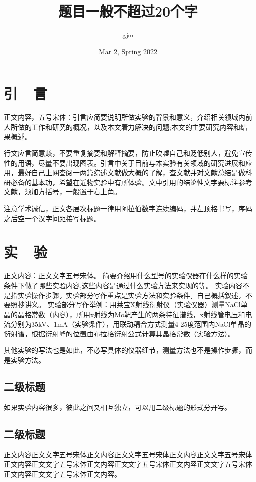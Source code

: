 \documentclass{gjm_report}
\date{Mar 2, Spring 2022}
\title{题目一般不超过20个字}
\author{gjm}
\begin{document}
\maketitle
\begin{multicols}{2}

\section{引~~言}
正文内容，五号宋体：引言应简要说明所做实验的背景和意义，介绍相关领域内前人所做的工作和研究的概况，以及本文着力解决的问题;本文的主要研究内容和结果概述。

行文应言简意赅，不要重复摘要和解释摘要，防止吹嘘自己和贬低别人，避免宣传性的用语，尽量不要出现图表。引言中关于目前与本实验有关领域的研究进展和应用，最好自己上网查阅一两篇综述文献做大概的了解，查文献并对文献总结是做科研必备的基本功，希望在近物实验中有所体验。文中引用的结论性文字要标注参考文献，须加方括号，一般置于右上角。

注意学术诚信，正文各层次标题一律用阿拉伯数字连续编码，并左顶格书写，序码之后空一个汉字间距接写标题。


\section{实~~验}
正文内容：正文文字五号宋体。
简要介绍用什么型号的实验仪器在什么样的实验条件下做了哪些实验内容,这些内容是通过什么实验方法来实现的等。
实验内容不是指实验操作步骤，实验部分写作重点是实验方法和实验条件，自己概括叙述，不要照抄讲义。
实验部分写作举例：用莱宝X射线衍射仪（实验仪器）测量NaCl单晶的晶格常数（内容），所用x射线为Mo靶产生的两条特征谱线，x射线管电压和电流分别为35kV、1mA（实验条件），用联动耦合方式测量4-25度范围内NaCl单晶的衍射谱，根据衍射峰的位置由布拉格衍射公式计算其晶格常数（实验方法）。

其他实验的写法也是如此，不必写具体的仪器细节，测量方法也不是操作步骤，而是实验方法。

  \subsection{二级标题}
  如果实验内容很多，彼此之间又相互独立，可以用二级标题的形式分开写。

  \subsection{二级标题}
  正文内容正文文字五号宋体正文内容正文文字五号宋体正文内容正文文字五号宋体正文内容正文文字五号宋体正文内容正文文字五号宋体正文内容正文文字五号宋体正文内容正文文字五号宋体正文内容。


\end{multicols}
\end{document}
